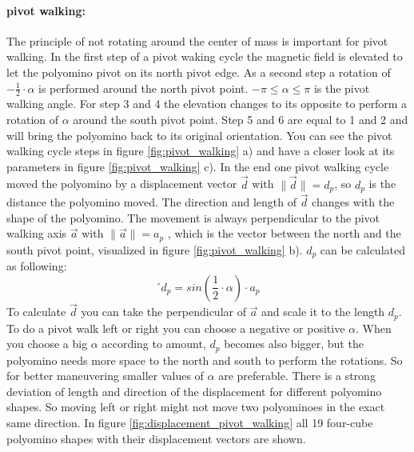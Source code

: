 \paragraph{pivot walking:}
The principle of not rotating around the center of mass is important for pivot walking.
In the first step of a pivot waking cycle the magnetic field is elevated to let the polyomino pivot on its north pivot edge.
As a second step a rotation of $-\frac{1}{2} \cdot \alpha$ is performed around the north pivot point.
$-\pi \leq \alpha \leq \pi$ is the pivot walking angle.
For step 3 and 4 the elevation changes to its opposite to perform a rotation of $\alpha$ around the south pivot point.
Step 5 and 6 are equal to 1 and 2 and will bring the polyomino back to its original orientation.
You can see the pivot walking cycle steps in figure \ref{fig:pivot_walking} a) and have a closer look at its parameters in figure \ref{fig:pivot_walking} c).
In the end one pivot walking cycle moved the polyomino by a displacement vector $\vec{d}$ with $\lVert \vec{d} \rVert = d_p$, so $d_p$ is the distance the polyomino moved.
The direction and length of $\vec{d}$ changes with the shape of the polyomino.
The movement is always perpendicular to the pivot walking axis $\vec{a}$ with $\lVert \vec{a} \rVert = a_p$ , which is the vector between the north and the south pivot point, visualized in figure \ref{fig:pivot_walking} b).
$d_p$ can be calculated as following:
\begin{equation*}´
d_p = sin(\frac{1}{2} \cdot \alpha) \cdot a_p
\end{equation*}
To calculate $\vec{d}$ you can take the perpendicular of $\vec{a}$ and scale it to the length $d_p$.
To do a pivot walk left or right you can choose a negative or positive $\alpha$.
When you choose a big $\alpha$ according to amount, $d_p$ becomes also bigger, but the polyomino needs more space to the north and south to perform the rotations.
So for better maneuvering smaller values of $\alpha$ are preferable.
There is a strong deviation of length and direction of the displacement for different polyomino shapes.
So moving left or right might not move two polyominoes in the exact same direction.
In figure \ref{fig:displacement_pivot_walking} all 19 four-cube polyomino shapes with their displacement vectors are shown.

